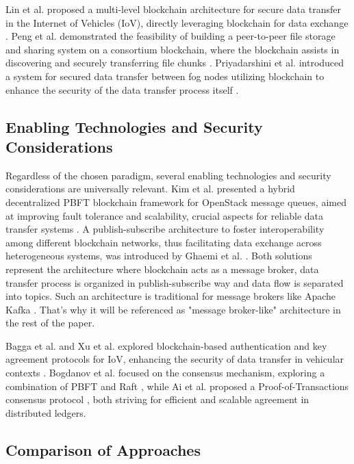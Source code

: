 \documentclass[10pt]{llncs}
\begin{document}
Lin et al. proposed a multi-level blockchain architecture for secure data transfer in the Internet of Vehicles (IoV), 
directly leveraging blockchain for data exchange \cite{Lin2023}. 
Peng et al. demonstrated the feasibility of building a peer-to-peer file storage and sharing system on a consortium blockchain, 
where the blockchain assists in discovering and securely transferring file chunks \cite{Peng2023}. 
Priyadarshini et al. introduced a system for secured data transfer between fog nodes utilizing blockchain to enhance the security of 
the data transfer process itself \cite{Priyadarshini2021}.

\subsection{Enabling Technologies and Security Considerations}

Regardless of the chosen paradigm, several enabling technologies and security considerations are universally relevant. 
Kim et al. presented a hybrid decentralized PBFT blockchain framework for OpenStack message queues, aimed at improving fault tolerance and scalability, 
crucial aspects for reliable data transfer systems \cite{kim2020hybrid}. 
A publish-subscribe architecture to foster interoperability among different blockchain networks, thus facilitating data exchange across heterogeneous systems, was introduced by Ghaemi et al. \cite{Ghaemi2021}. 
Both solutions represent the architecture where blockchain acts as a message broker, data transfer process is organized in publish-subscribe way and data flow is separated into topics. 
Such an architecture is traditional for message brokers like Apache Kafka \cite{apachekafka}.
That's why it will be referenced as "message broker-like" architecture in the rest of the paper.

Bagga et al. and Xu et al. explored blockchain-based authentication and key agreement protocols for IoV, enhancing the security of data transfer in vehicular contexts \cite{Bagga2021,Xu2021}. 
Bogdanov et al. focused on the consensus mechanism, exploring a combination of PBFT and Raft \cite{Bogdanov2024}, while Ai et al. proposed a Proof-of-Transactions consensus protocol \cite{Ai2022}, 
both striving for efficient and scalable agreement in distributed ledgers. 

\subsection{Comparison of Approaches}
\end{document}
